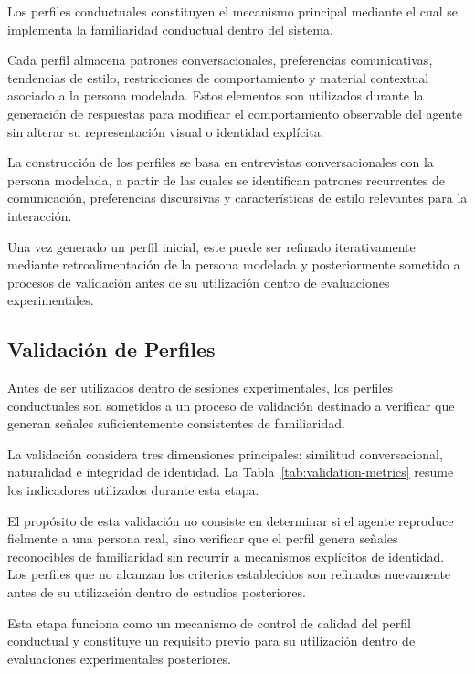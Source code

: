 \documentclass[sigconf, nonacm, language=spanish]{acmart}
\begin{document}
Los perfiles conductuales constituyen el mecanismo principal mediante el cual se implementa la familiaridad conductual dentro del sistema.

Cada perfil almacena patrones conversacionales, preferencias comunicativas, tendencias de estilo, restricciones de comportamiento y material contextual asociado a la persona modelada. Estos elementos son utilizados durante la generación de respuestas para modificar el comportamiento observable del agente sin alterar su representación visual o identidad explícita.

La construcción de los perfiles se basa en entrevistas conversacionales con la persona modelada, a partir de las cuales se identifican patrones recurrentes de comunicación, preferencias discursivas y características de estilo relevantes para la interacción.

Una vez generado un perfil inicial, este puede ser refinado iterativamente mediante retroalimentación de la persona modelada y posteriormente sometido a procesos de validación antes de su utilización dentro de evaluaciones experimentales.

\subsection{Validación de Perfiles}

Antes de ser utilizados dentro de sesiones experimentales, los perfiles conductuales son sometidos a un proceso de validación destinado a verificar que generan señales suficientemente consistentes de familiaridad.

La validación considera tres dimensiones principales: similitud conversacional, naturalidad e integridad de identidad. La Tabla~\ref{tab:validation-metrics} resume los indicadores utilizados durante esta etapa.

El propósito de esta validación no consiste en determinar si el agente reproduce fielmente a una persona real, sino verificar que el perfil genera señales reconocibles de familiaridad sin recurrir a mecanismos explícitos de identidad. Los perfiles que no alcanzan los criterios establecidos son refinados nuevamente antes de su utilización dentro de estudios posteriores.

Esta etapa funciona como un mecanismo de control de calidad del perfil conductual y constituye un requisito previo para su utilización dentro de evaluaciones experimentales posteriores.
\end{document}
